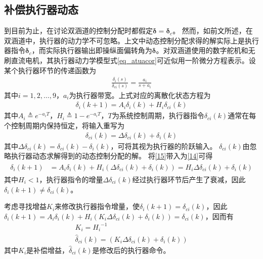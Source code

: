 \subsection{补偿执行器动态}
到目前为止，在讨论双涵道的控制分配时都假定$ \bm{\delta} = \bm{ \delta}_c $。 然而，如前文所述，在双涵道中，执行器的动力学不可忽略。上文中动态控制分配求得的解实际上是执行器指令$ \bm{\delta}_c $，而实际执行器输出即操纵面偏转角为$ \bm{\delta} $。对双涵道使用的数字舵机和无刷直流电机，其执行器动力学模型式\eqref{eq_atuacor}可近似用一阶微分方程表示。设某个执行器环节的传递函数为
\begin{align}
\frac{\delta_{ {i}}\left( s \right)}
{ \delta_{c {i}}\left( s\right)}
=\frac{a_i}{s+a_{ {i}}}
\end{align}
其中$ i=1,2,\ldots,9 $，$ a_i $为执行器带宽。上式对应的离散化状态方程为
\begin{align}
\delta_{ {i}}\left( k+1 \right)=A_{ {i}}  \delta _{ {i}} \left( k \right)+H_{ {i}}  \delta_{c {i}}\left( k \right) \label{14}
\end{align}
其中$A_{ {i}}\triangleq {e}^{ {-{{a}_{i}}T}}$，$H_{ {i}}\triangleq 1-{e}^{ {-{{a}_{i}}T}}$，$ T $为系统控制周期，执行器指令$ \delta_{c {i}}\left( k \right)$通常在每个控制周期内保持恒定，将输入重写为
\begin{align}
 \delta_{c {i}}\left( k \right)= \Delta  \delta_{ci}\left( k \right)+ \delta _{ {i}}\left( k \right) \label{15}
\end{align}
其中$\Delta  \delta_{c {i}}\left( k \right)= \delta_{ c{i}}\left( k \right)-\delta _{ {i}}\left( k \right)$，可将其视为执行器的阶跃输入。 $ \delta_{c {i}}\left( k \right)$由忽略执行器动态求解得到的动态控制分配的解。 将\eqref{15}带入为\eqref{14}可得
\begin{align}
\begin{split}
\delta_{ {i}}\left( k+1 \right) &=A_{ {i}}  \delta _{ {i}} \left( k \right)+H_{ {i}} \left(\Delta  \delta_{ c{i}}\left( k \right)+ \delta _{ {i}}\left( k \right) \right)=H_{ {i}}\Delta  \delta_{c {i}}\left( k \right)+\delta _{ {i}}\left( k \right) 
\end{split}
\end{align}
其中$H_{ {i}}<1$，执行器指令的增量$\Delta  \delta_{c {i}}\left( k \right)$经过执行器环节后产生了衰减，因此$\delta_{ {i}}\left( k+1 \right) \neq  \delta_{ c{i}}\left( k \right)$。

考虑寻找增益$K_{ {i}}$来修改执行器指令增量，使$\delta_{ {i}}\left( k+1 \right) =  \delta_{ c{i}}\left( k \right)$，因此$\delta_{ {i}}\left( k+1 \right) =A_{ {i}}  \delta _{ {i}} \left( k \right)+H_{ {i}} \left(K_{ {i}} \Delta  \delta_{ c{i}}\left( k \right)+ \delta _{ {i}} \left( k \right) \right) =   \delta_{c {i}}\left( k \right)
$，因而有
\begin{gather}
K_{ {i}} = {H_{ {i}}}^{-1} \\
\hat{ \delta}_{c {i}}\left( k \right) = \left(K_{ {i}} \Delta  \delta_{c {i}}\left( k \right)+ \delta _{ {i}} \left( k \right) \right)
\end{gather}
其中$K_{ {i}}$是补偿增益，$\hat{ \delta}_{ c{i}}\left( k \right)$是修改后的执行器命令。

